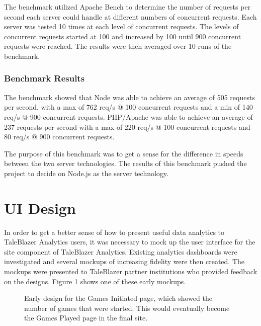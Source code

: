 The benchmark utilized Apache Bench to determine the number of requests per second each server could handle at different numbers of concurrent requests. Each server was tested 10 times at each level of concurrent requests. The levels of concurrent requests started at 100 and increased by 100 until 900 concurrent requests were reached. The results were then averaged over 10 runs of the benchmark.

\subsubsection{Benchmark Results}	

The benchmark showed that Node was able to achieve an average of 505 requests per second, with a max of 762 req/s @ 100 concurrent requests and a min of 140 req/s @ 900 concurrent requests. PHP/Apache was able to achieve an average of 237 requests per second with a max of 220 req/s @ 100 concurrent requests and 80 req/s @ 900 concurrent requests. 

The purpose of this benchmark was to get a sense for the difference in speeds between the two server technologies. The results of this benchmark pushed the project to decide on Node.js as the server technology.

\section{UI Design}

In order to get a better sense of how to present useful data analytics to TaleBlazer Analytics users, it was necessary to mock up the user interface for the site component of TaleBlazer Analytics. Existing analytics dashboards were investigated and several mockups of increasing fidelity were then created. The mockups were presented to TaleBlazer partner institutions who provided feedback on the designs. Figure \ref{fig:mockup_initiated} shows one of these early mockups.

\begin{figure}[H]
	\caption[Early Analytics Site Mockup]{\label{fig:mockup_initiated} Early design for the Games Initiated page, which showed the number of games that were started. This would eventually become the Games Played page in the final site.}
\end{figure}


